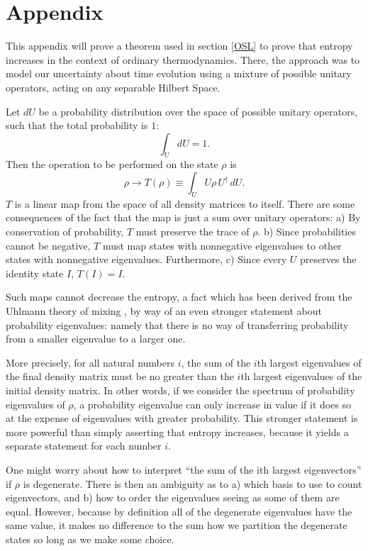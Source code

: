 \documentclass{article}
\begin{document}
\section*{Appendix}

This appendix will prove a theorem used in section \ref{OSL} to prove that entropy increases in the context of ordinary thermodynamics.  There, the approach was to model our uncertainty about time evolution using a mixture of possible unitary operators, acting on any separable Hilbert Space.

Let $dU$ be a probability distribution over the space of possible unitary operators, such that the total probability is $1$:
\begin{equation}
\int_U dU = 1.
\end{equation}
Then the operation to be performed on the state $\rho$ is
\begin{equation}
\rho \to T(\rho) \equiv \int_U U \rho\,U^\dagger\,dU.
\end{equation}
$T$ is a linear map from the space of all density matrices to itself.  There are some consequences of the fact that the map is just a sum over unitary operators:  a) By conservation of probability, $T$ must preserve the trace of $\rho$.  b) Since probabilities cannot be negative, $T$ must map states with nonnegative eigenvalues to other states with nonnegative eigenvalues.  Furthermore, c) Since every $U$ preserves the identity state $I$, $T(I) = I$.  

Such maps cannot decrease the entropy, a fact which has been derived from the Uhlmann theory of mixing \cite{Uhlmann}, by way of an even stronger statement about probability eigenvalues: namely that there is no way of transferring probability from a smaller eigenvalue to a larger one.  

More precisely, for all natural numbers $i$, the sum of the $i$th largest eigenvalues of the final density matrix must be no greater than the $i$th largest eigenvalues of the initial density matrix.  In other words, if we consider the spectrum of probability eigenvalues of $\rho$, a probability eigenvalue can only increase in value if it does so at the expense of eigenvalues with greater probability.  This stronger statement is more powerful than simply asserting that entropy increases, because it yields a separate statement for each number $i$.

One might worry about how to interpret ``the sum of the ith largest eigenvectors'' if $\rho$ is degenerate.  There is then an ambiguity as to a) which basis to use to count eigenvectors, and b) how to order the eigenvalues seeing as some of them are equal.   However, because by definition all of the degenerate eigenvalues have the same value, it makes no difference to the sum how we partition the degenerate states so long as we make some choice.
\end{document}
